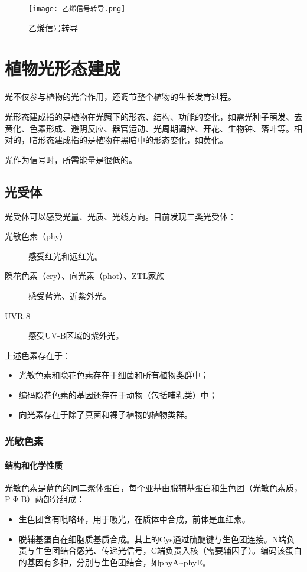\begin{figure}[htbp]
	\centering
	\texttt{[image: 乙烯信号转导.png]}
	\caption{乙烯信号转导}
	\label{fig:乙烯信号转导}
\end{figure}

\section{植物光形态建成}

光不仅参与植物的光合作用，还调节整个植物的生长发育过程。

光形态建成指的是植物在光照下的形态、结构、功能的变化，如需光种子萌发、去黄化、色素形成、避阴反应、器官运动、光周期调控、开花、生物钟、落叶等。相对的，暗形态建成指的是植物在黑暗中的形态变化，如黄化。

光作为信号时，所需能量是很低的。

\subsection{光受体}

光受体可以感受光量、光质、光线方向。目前发现三类光受体：
\begin{description}
	\item[光敏色素（phy）] 感受红光和远红光。
	\item[隐花色素（cry）、向光素（phot）、ZTL家族] 感受蓝光、近紫外光。
	\item[UVR-8] 感受UV-B区域的紫外光。
\end{description}

上述色素存在于：

\begin{itemize}
	\item 光敏色素和隐花色素存在于细菌和所有植物类群中；
	\item 编码隐花色素的基因还存在于动物（包括哺乳类）中；
	\item 向光素存在于除了真菌和裸子植物的植物类群。
\end{itemize}

\subsubsection{光敏色素}

\paragraph{结构和化学性质}

光敏色素是蓝色的同二聚体蛋白，每个亚基由脱辅基蛋白和生色团（光敏色素质，P$\upPhi$B）两部分组成：
\begin{itemize}
	\item 生色团含有吡咯环，用于吸光，在质体中合成，前体是血红素。
	\item 脱辅基蛋白在细胞质基质合成。其上的Cys通过硫醚键与生色团连接。N端负责与生色团结合感光、传递光信号，C端负责入核（需要辅因子）。编码该蛋白的基因有多种，分别与生色团结合，如phyA\textasciitilde phyE。
\end{itemize}

